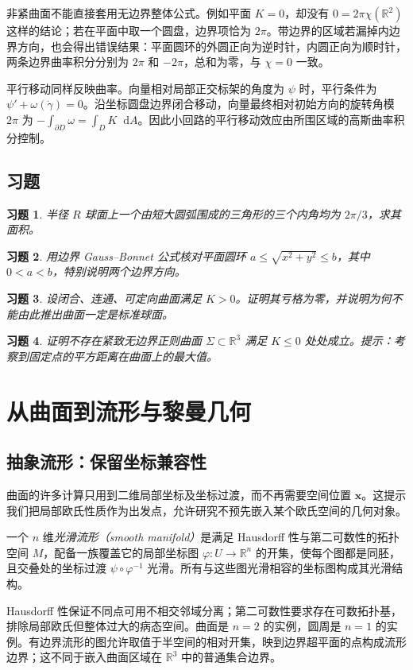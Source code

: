 \documentclass[UTF8,12pt,a4paper,fontset=fandol]{ctexbook}
\newcommand{\R}{\mathbb R}
\newcommand{\dd}{\mathop{}\!\mathrm d}
\newtheorem{exercise}{习题}[chapter]
\begin{document}
非紧曲面不能直接套用无边界整体公式。例如平面 $K=0$，却没有 $0=2\pi\chi(\R^2)$ 这样的结论；若在平面中取一个圆盘，边界项恰为 $2\pi$。带边界的区域若漏掉内边界方向，也会得出错误结果：平面圆环的外圆正向为逆时针，内圆正向为顺时针，两条边界曲率积分分别为 $2\pi$ 和 $-2\pi$，总和为零，与 $\chi=0$ 一致。

平行移动同样反映曲率。向量相对局部正交标架的角度为 $\psi$ 时，平行条件为 $\psi'+\omega(\dot\gamma)=0$。沿坐标圆盘边界闭合移动，向量最终相对初始方向的旋转角模 $2\pi$ 为 $-\int_{\partial D}\omega=\int_DK\dd A$。因此小回路的平行移动效应由所围区域的高斯曲率积分控制。

\section{习题}
\begin{exercise}\label{ex:dg-gb-triangle}
半径 $R$ 球面上一个由短大圆弧围成的三角形的三个内角均为 $2\pi/3$，求其面积。
\end{exercise}
\begin{exercise}\label{ex:dg-gb-annulus}
用边界 Gauss--Bonnet 公式核对平面圆环 $a\le\sqrt{x^2+y^2}\le b$，其中 $0<a<b$，特别说明两个边界方向。
\end{exercise}
\begin{exercise}\label{ex:dg-gb-positive}
设闭合、连通、可定向曲面满足 $K>0$。证明其亏格为零，并说明为何不能由此推出曲面一定是标准球面。
\end{exercise}
\begin{exercise}\label{ex:dg-gb-flat-embedded}
证明不存在紧致无边界正则曲面 $\Sigma\subset\R^3$ 满足 $K\le0$ 处处成立。提示：考察到固定点的平方距离在曲面上的最大值。
\end{exercise}

\chapter{从曲面到流形与黎曼几何}
\label{chap:dg-manifolds}

\section{抽象流形：保留坐标兼容性}
曲面的许多计算只用到二维局部坐标及坐标过渡，而不再需要空间位置 $\mathbf x$。这提示我们把局部欧氏性质作为出发点，允许研究不预先嵌入某个欧氏空间的几何对象。

\begin{definition}[光滑流形]
一个 $n$ 维\emph{光滑流形（smooth manifold）}是满足 Hausdorff 性与第二可数性的拓扑空间 $M$，配备一族覆盖它的局部坐标图 $\varphi:U\to\R^n$ 的开集，使每个图都是同胚，且交叠处的坐标过渡 $\psi\circ\varphi^{-1}$ 光滑。所有与这些图光滑相容的坐标图构成其光滑结构。
\end{definition}
Hausdorff 性保证不同点可用不相交邻域分离；第二可数性要求存在可数拓扑基，排除局部欧氏但整体过大的病态空间。曲面是 $n=2$ 的实例，圆周是 $n=1$ 的实例。有边界流形的图允许取值于半空间的相对开集，映到边界超平面的点构成流形边界；这不同于嵌入曲面区域在 $\R^3$ 中的普通集合边界。
\end{document}
